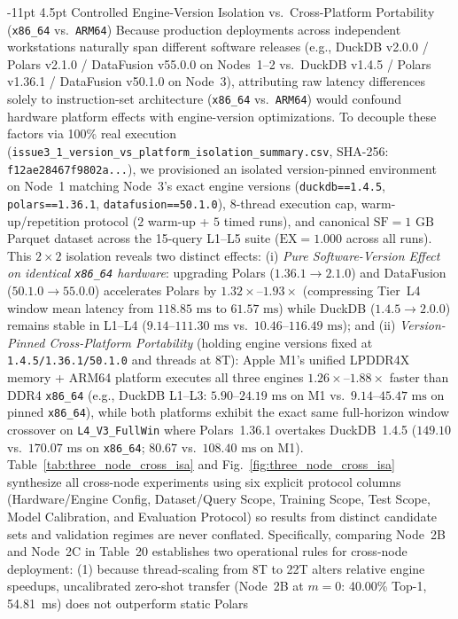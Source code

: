 \documentclass[10pt,a4paper]{article}
\makeatletter
\renewcommand\subsubsection{\@startsection{subsubsection}{3}{\z@}%
  {-11pt \@plus -2.5pt \@minus -1pt}%
  {4.5pt \@plus 1pt}%
  {\normalfont\normalsize\bfseries}}
\makeatother
\begin{document}
\subsubsection{Controlled Engine-Version Isolation vs.\ Cross-Platform Portability (\texttt{x86\_64} vs.\ \texttt{ARM64})}
Because production deployments across independent workstations naturally span different software releases (e.g., DuckDB v2.0.0 / Polars v2.1.0 / DataFusion v55.0.0 on Nodes~1--2 vs.\ DuckDB v1.4.5 / Polars v1.36.1 / DataFusion v50.1.0 on Node~3), attributing raw latency differences solely to instruction-set architecture (\texttt{x86\_\allowbreak{}64} vs.\ \texttt{ARM64}) would confound hardware platform effects with engine-version optimizations. To decouple these factors via 100\% real execution (\texttt{issue3\_\allowbreak{}1\_\allowbreak{}version\_\allowbreak{}vs\_\allowbreak{}platform\_\allowbreak{}isolation\_\allowbreak{}summary.csv}, SHA-256: \texttt{f12ae28467f9802a...}), we provisioned an isolated version-pinned environment on Node~1 matching Node~3's exact engine versions (\texttt{duckdb==1.4.5}, \texttt{polars==1.36.1}, \texttt{datafusion==50.1.0}), 8-thread execution cap, warm-up/repetition protocol ($2$ warm-up + $5$ timed runs), and canonical $\text{SF}=1\text{ GB}$ Parquet dataset across the 15-query L1--L5 suite ($\text{EX}=1.000$ across all runs). This $2\times 2$ isolation reveals two distinct effects: (i) \emph{Pure Software-Version Effect on identical \texttt{x86\_\allowbreak{}64} hardware}: upgrading Polars ($1.36.1 \rightarrow 2.1.0$) and DataFusion ($50.1.0 \rightarrow 55.0.0$) accelerates Polars by $1.32\times\text{--}1.93\times$ (compressing Tier~L4 window mean latency from $118.85\text{ ms}$ to $61.57\text{ ms}$) while DuckDB ($1.4.5 \rightarrow 2.0.0$) remains stable in L1--L4 ($9.14\text{--}111.30\text{ ms}$ vs.\ $10.46\text{--}116.49\text{ ms}$); and (ii) \emph{Version-Pinned Cross-Platform Portability} (holding engine versions fixed at \texttt{1.4.5/\allowbreak{}1.36.1/\allowbreak{}50.1.0} and threads at $8\text{T}$): Apple M1's unified LPDDR4X memory + ARM64 platform executes all three engines $1.26\times\text{--}1.88\times$ faster than DDR4 \texttt{x86\_\allowbreak{}64} (e.g., DuckDB L1--L3: $5.90\text{--}24.19\text{ ms}$ on M1 vs.\ $9.14\text{--}45.47\text{ ms}$ on pinned \texttt{x86\_\allowbreak{}64}), while both platforms exhibit the exact same full-horizon window crossover on \texttt{L4\_\allowbreak{}V3\_\allowbreak{}FullWin} where Polars~1.36.1 overtakes DuckDB~1.4.5 ($149.10$ vs.\ $170.07\text{ ms}$ on \texttt{x86\_\allowbreak{}64}; $80.67$ vs.\ $108.40\text{ ms}$ on M1). Table~\ref{tab:three_node_cross_isa} and Fig.~\ref{fig:three_node_cross_isa} synthesize all cross-node experiments using six explicit protocol columns (Hardware/Engine Config, Dataset/Query Scope, Training Scope, Test Scope, Model Calibration, and Evaluation Protocol) so results from distinct candidate sets and validation regimes are never conflated. Specifically, comparing Node~2B and Node~2C in Table~20 establishes two operational rules for cross-node deployment: (1) because thread-scaling from 8T to 22T alters relative engine speedups, uncalibrated zero-shot transfer (Node~2B at $m=0$: 40.00\% Top-1, 54.81~ms) does not outperform static Polars 
\end{document}
